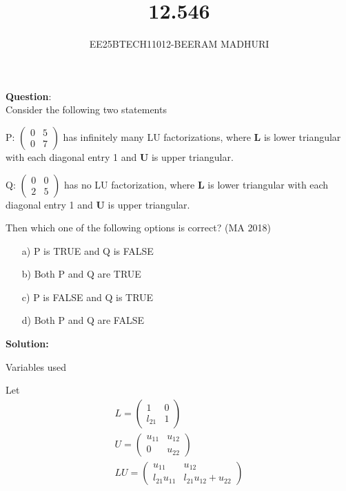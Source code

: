 \documentclass[journal]{IEEEtran}
\begin{document}

\vspace{3cm}

\title{12.546}
\author{EE25BTECH11012-BEERAM MADHURI}
{\let\newpage\relax\maketitle}

\renewcommand{\thefigure}{\theenumi}
\renewcommand{\thetable}{\theenumi}
\setlength{\intextsep}{10pt} %


\renewcommand{\thetable}{\theenumi}


\textbf{Question}:\\
Consider the following two statements

P: $\begin{pmatrix} 0 & 5 \\ 0 & 7 \end{pmatrix}$ has infinitely many LU factorizations, where $\mathbf{L}$ is lower triangular with each diagonal entry 1 and $\mathbf{U}$ is upper triangular.

Q: $\begin{pmatrix} 0 & 0 \\ 2 & 5 \end{pmatrix}$ has no LU factorization, where $\mathbf{L}$ is lower triangular with each diagonal entry 1 and $\mathbf{U}$ is upper triangular.

Then which one of the following options is correct? \hfill (MA 2018)

\begin{enumerate}
    \item[a)] P is TRUE and Q is FALSE
    \item[b)] Both P and Q are TRUE
    \item[c)] P is FALSE and Q is TRUE
    \item[d)] Both P and Q are FALSE
\end{enumerate}

\textbf{Solution:}\\
\begin{table}[H]
    \centering
    
    \caption{Variables used}
    \label{table 12.546}
\end{table}
Let 
\begin{align}
L = \begin{pmatrix} 1 & 0 \\ l_{21} & 1 \end{pmatrix}\\
U = \begin{pmatrix} u_{11} & u_{12} \\ 0 & u_{22} \end{pmatrix}\\
LU = \begin{pmatrix} u_{11} & u_{12} \\ l_{21}u_{11} & l_{21}u_{12} + u_{22} \end{pmatrix}
\end{align}
\end{document}
